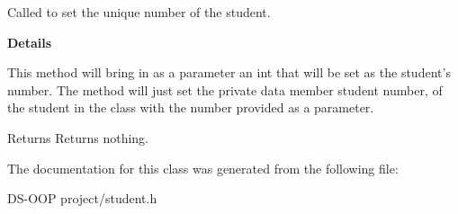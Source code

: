 Called to set the unique number of the student. 

{\bfseries Details}

This method will bring in as a parameter an int that will be set as the student's number. The method will just set the private data member student number, of the student in the class with the number provided as a parameter.

\begin{DoxyReturn}{Returns}
Returns nothing. 
\end{DoxyReturn}


The documentation for this class was generated from the following file\-:\begin{DoxyCompactItemize}
\item 
D\-S-\/\-O\-O\-P project/student.\-h\end{DoxyCompactItemize}
